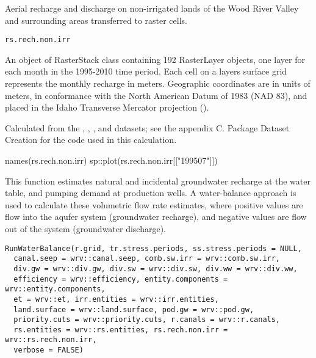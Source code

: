 \documentclass[a4paper]{book}
\begin{document}
\begin{Description}\relax
Aerial recharge and discharge on non-irrigated lands of the Wood River Valley and
surrounding areas transferred to raster cells.
\end{Description}
%
\begin{Usage}
\begin{verbatim}
rs.rech.non.irr
\end{verbatim}
\end{Usage}
%
\begin{Format}
An object of RasterStack class containing 192 RasterLayer objects,
one layer for each month in the 1995-2010 time period.
Each cell on a layers surface grid represents the monthly recharge in meters.
Geographic coordinates are in units of meters, in conformance with the
North American Datum of 1983 (NAD 83), and placed in the
Idaho Transverse Mercator projection ().
\end{Format}
%
\begin{Source}\relax
Calculated from the , ,
, and  datasets;
see the appendix C. Package Dataset Creation for the \R{} code used in this calculation.
\end{Source}
%
\begin{Examples}
\begin{ExampleCode}
names(rs.rech.non.irr)
sp::plot(rs.rech.non.irr[["199507"]])

\end{ExampleCode}
\end{Examples}
%
\begin{Description}\relax
This function estimates natural and incidental groundwater recharge at the water table,
and pumping demand at production wells.
A water-balance approach is used to calculate these volumetric flow rate estimates,
where positive values are flow into the aqufer system (groundwater recharge),
and negative values are flow out of the system (groundwater discharge).
\end{Description}
%
\begin{Usage}
\begin{verbatim}
RunWaterBalance(r.grid, tr.stress.periods, ss.stress.periods = NULL,
  canal.seep = wrv::canal.seep, comb.sw.irr = wrv::comb.sw.irr,
  div.gw = wrv::div.gw, div.sw = wrv::div.sw, div.ww = wrv::div.ww,
  efficiency = wrv::efficiency, entity.components = wrv::entity.components,
  et = wrv::et, irr.entities = wrv::irr.entities,
  land.surface = wrv::land.surface, pod.gw = wrv::pod.gw,
  priority.cuts = wrv::priority.cuts, r.canals = wrv::r.canals,
  rs.entities = wrv::rs.entities, rs.rech.non.irr = wrv::rs.rech.non.irr,
  verbose = FALSE)
\end{verbatim}
\end{Usage}
\end{document}
